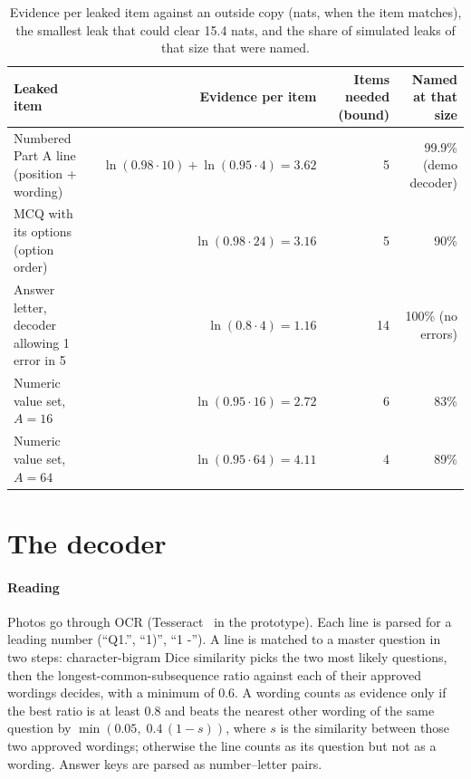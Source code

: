 \documentclass[10pt,a4paper]{article}
\theoremstyle{remark}
\newcommand{\tablefont}{\sffamily\footnotesize}
\begin{document}
\begin{table}[t]
\centering\tablefont
\caption{Evidence per leaked item against an outside copy (nats, when the item matches), the smallest leak that could clear 15.4 nats, and the share of simulated leaks of that size that were named.}
\label{tab:capacity}
\begin{tabularx}{\linewidth}{@{}Y r r r@{}}
\toprule
Leaked item & Evidence per item & Items needed (bound) & Named at that size \\
\midrule
Numbered Part A line (position + wording) & $\ln(0.98{\cdot}10)+\ln(0.95{\cdot}4)=3.62$ & 5 & 99.9\% (demo decoder) \\
MCQ with its options (option order) & $\ln(0.98{\cdot}24)=3.16$ & 5 & 90\% \\
Answer letter, decoder allowing 1 error in 5 & $\ln(0.8{\cdot}4)=1.16$ & 14 & 100\% (no errors) \\
Numeric value set, $A=16$ & $\ln(0.95{\cdot}16)=2.72$ & 6 & 83\% \\
Numeric value set, $A=64$ & $\ln(0.95{\cdot}64)=4.11$ & 4 & 89\% \\
\bottomrule
\end{tabularx}
\end{table}

\section{The decoder}
\label{sec:decoder}

\paragraph{Reading} Photos go through OCR (Tesseract~\citep{smith2007} in the prototype). Each line is parsed for a leading number (\enquote{Q1.}, \enquote{1)}, \enquote{1 -}). A line is matched to a master question in two steps: character-bigram Dice similarity picks the two most likely questions, then the longest-common-subsequence ratio against each of their approved wordings decides, with a minimum of 0.6. A wording counts as evidence only if the best ratio is at least 0.8 and beats the nearest other wording of the same question by $\min(0.05,\;0.4\,(1-s))$, where $s$ is the similarity between those two approved wordings; otherwise the line counts as its question but not as a wording. Answer keys are parsed as number--letter pairs.
\end{document}
